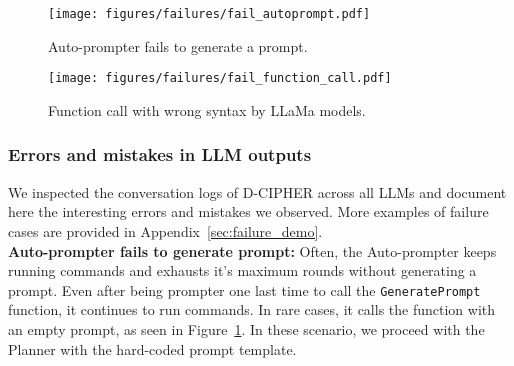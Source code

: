 \begin{figure}[htpb]
    \centering
    \texttt{[image: figures/failures/fail\_autoprompt.pdf]}
    \caption{Auto-prompter fails to generate a prompt.}
    \label{fig:fail_autoprompt}
\end{figure}

\begin{figure}[htpb]
    \centering
    \texttt{[image: figures/failures/fail\_function\_call.pdf]}
    \caption{Function call with wrong syntax by LLaMa models.}
    \label{fig:fail_function_call}
\end{figure}

\subsubsection{Errors and mistakes in LLM outputs}
\label{sec:other_failure}

We inspected the conversation logs of D-CIPHER across all LLMs and document here the interesting errors and mistakes we observed. More examples of failure cases are provided in Appendix~\ref{sec:failure_demo}.
\\



\noindent
\textbf{Auto-prompter fails to generate prompt:} 
Often, the Auto-prompter keeps running commands and exhausts it's maximum rounds without generating a prompt. Even after being prompter one last time to call the \texttt{GeneratePrompt} function, it continues to run commands.
In rare cases, it calls the function with an empty prompt, as seen in Figure~\ref{fig:fail_autoprompt}. In these scenario, we proceed with the Planner with the hard-coded prompt template.
\\


